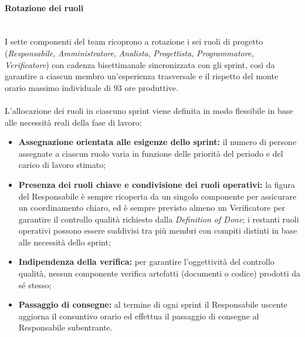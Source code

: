 \paragraph{Rotazione dei ruoli}~\\[0.15cm]
I sette componenti del team ricoprono a rotazione i sei ruoli di progetto (\textit{Responsabile}, \textit{Amministratore}, \textit{Analista}, \textit{Progettista}, \textit{Programmatore}, \textit{Verificatore}) con cadenza bisettimanale sincronizzata con gli sprint, così da garantire a ciascun membro un'esperienza trasversale e il rispetto del monte orario massimo individuale di 93 ore produttive. \\
\\
L'allocazione dei ruoli in ciascuno sprint viene definita in modo flessibile in base alle necessità reali della fase di lavoro:
\begin{itemize}
    \item \textbf{Assegnazione orientata alle esigenze dello sprint:} il numero di persone assegnate a ciascun ruolo varia in funzione delle priorità del periodo e del carico di lavoro stimato;
    \item \textbf{Presenza dei ruoli chiave e condivisione dei ruoli operativi:} la figura del Responsabile è sempre ricoperta da un singolo componente per assicurare un coordinamento chiaro, ed è sempre previsto almeno un Verificatore per garantire il controllo qualità richiesto dalla \textit{Definition of Done}; i restanti ruoli operativi possono essere suddivisi tra più membri con compiti distinti in base alle necessità dello sprint;
    \item \textbf{Indipendenza della verifica:} per garantire l'oggettività del controllo qualità, nessun componente verifica artefatti (documenti o codice) prodotti da sé stesso;
    \item \textbf{Passaggio di consegne:} al termine di ogni sprint il Responsabile uscente aggiorna il consuntivo orario ed effettua il passaggio di consegne al Responsabile subentrante.
\end{itemize}

